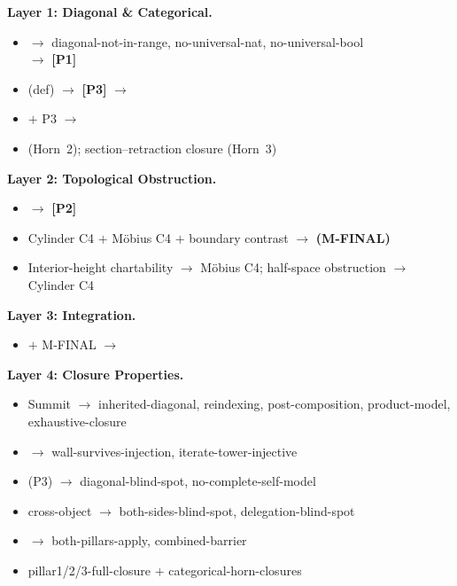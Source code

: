\documentclass[11pt]{article}
\begin{document}
{\small
\noindent\textbf{Layer 1: Diagonal \& Categorical.}
\begin{itemize}[leftmargin=1.5em,itemsep=0.15ex,topsep=0.4ex,parsep=0pt]
\item {}
  $\to$
  diagonal-not-in-range, no-universal-nat, no-universal-bool\\
  $\to$ \textbf{[P1]}
\item {} (def) $\to$
  \textbf{[P3]}
  $\to$
\item {}
  $+$ P3 $\to$
\item {} (Horn~2);\enspace
  section--retraction closure (Horn~3)
\end{itemize}

\noindent\textbf{Layer 2: Topological Obstruction.}
\begin{itemize}[leftmargin=1.5em,itemsep=0.15ex,topsep=0.4ex,parsep=0pt]
\item {} $\to$
  \textbf{[P2]}
\item Cylinder C4 $+$ M\"obius C4 $+$ boundary contrast $\to$
  \textbf{(M-FINAL)}
\item Interior-height chartability $\to$ M\"obius C4;\enspace
  half-space obstruction $\to$ Cylinder C4
\end{itemize}

\noindent\textbf{Layer 3: Integration.}
\begin{itemize}[leftmargin=1.5em,itemsep=0.15ex,topsep=0.4ex,parsep=0pt]
\item {}
  $+$ M-FINAL $\to$
\end{itemize}

\noindent\textbf{Layer 4: Closure Properties.}
\begin{itemize}[leftmargin=1.5em,itemsep=0.15ex,topsep=0.4ex,parsep=0pt]
\item Summit $\to$
  inherited-diagonal, reindexing,
  post-composition, product-model,
  exhaustive-closure
\item {} $\to$
  wall-survives-injection,
  iterate-tower-injective
\item {} (P3)
  $\to$ diagonal-blind-spot,
  no-complete-self-model
\item cross-object $\to$
  both-sides-blind-spot,
  delegation-blind-spot
\item {}
  $\to$ both-pillars-apply,
  combined-barrier
\item pillar1/2/3-full-closure $+$
  categorical-horn-closures
\end{itemize}
}%
\end{document}
